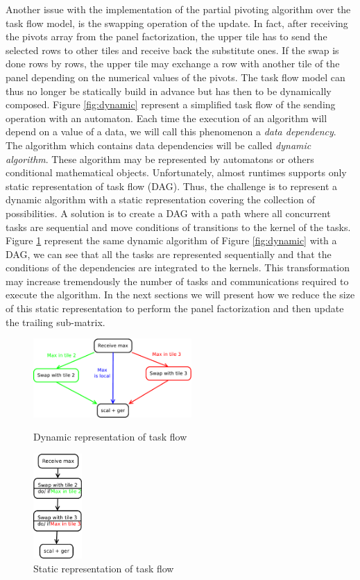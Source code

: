 Another issue with the implementation of the partial pivoting algorithm over the task flow model, is the swapping operation of the update. In fact, after receiving the pivots array from the panel factorization, the upper tile has to send the selected rows to other tiles and receive back the substitute ones. If the swap is done rows by rows, the upper tile may exchange a row with another tile of the panel depending on the numerical values of the pivots. The task flow model can thus no longer be statically build in advance but has then to be dynamically composed. Figure \ref{fig:dynamic} represent a simplified task flow of the sending operation with an automaton. Each time the execution of an algorithm will depend on a value of a data, we will call this phenomenon a \emph{data dependency}. The algorithm which contains data dependencies will be called \emph{dynamic algorithm}. These algorithm may be represented by automatons or others conditional mathematical objects. Unfortunately, almost runtimes supports only static representation of task flow (DAG). Thus, the challenge is to represent a dynamic algorithm with a static representation covering the collection of possibilities. A solution is to create a DAG with a path where all concurrent tasks are sequential and move conditions of transitions to the kernel of the tasks. Figure \ref{fig:static} represent the same dynamic algorithm of Figure \ref{fig:dynamic} with a DAG, we can see that all the tasks are represented sequentially and that the conditions of the dependencies are integrated to the kernels. This transformation may increase tremendously the number of tasks and communications required to execute the algorithm. In the next sections we will present how we reduce the size of this static representation to perform the panel factorization and then update the trailing sub-matrix.

\begin{figure}[!ht]
\begin{minipage}[!ht]{.5\textwidth}
\centering
\includegraphics[height=3cm]{figures/dynamic.pdf}
\caption{Dynamic representation of task flow\label{fig:dynamic}}
\end{minipage} \hfill
\begin{minipage}[!ht]{.5\textwidth}
\centering
\includegraphics[height=4cm]{figures/static.pdf}
\caption{Static representation of task flow\label{fig:static}}
\end{minipage}
\end{figure}
